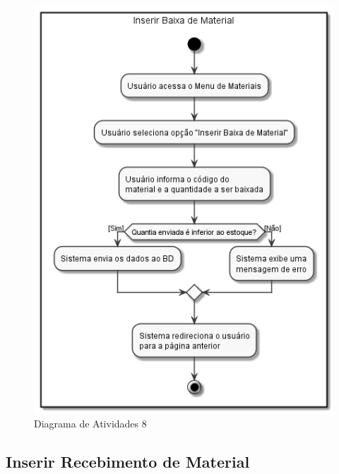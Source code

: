 \documentclass[rascunho,xindy,acronym,symbols]{fei}
\begin{document}
\begin{figure}[H]
    \centering
    \includegraphics[scale=0.6, width=400pt]{./Images/Inserir_Baixa_de_Material.png}
    \caption{Diagrama de Atividades 8}
    \label{fig:diag_atv8}
\end{figure}

\subsection{Inserir Recebimento de Material}
\end{document}
